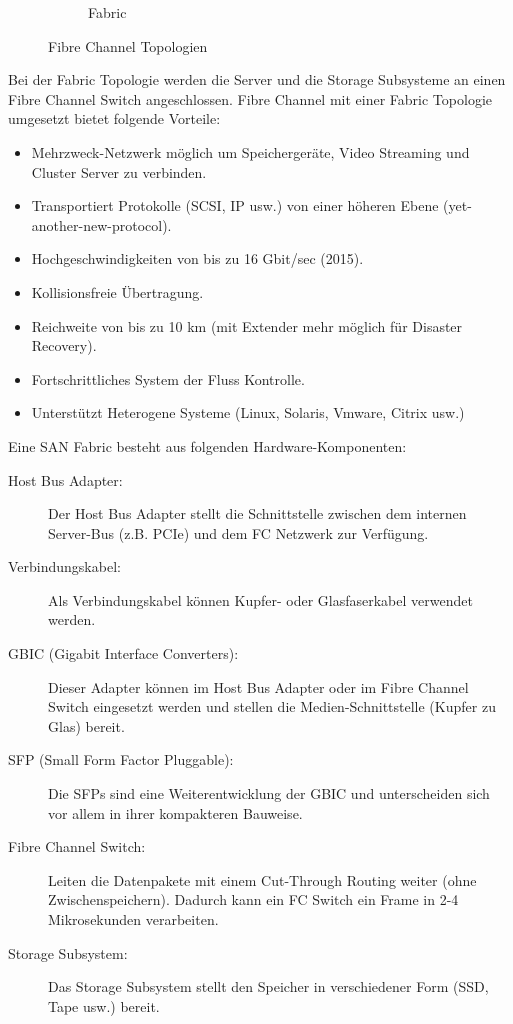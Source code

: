 \begin{figure}[h!]
\begin{subfigure}[b]{0.3\textwidth}
		\caption{Fabric}
	\end{subfigure}
	\caption{Fibre Channel Topologien}\label{fig:fc-topologien}
\end{figure}

\noindent
Bei der Fabric Topologie werden die Server und die Storage Subsysteme an einen Fibre Channel Switch angeschlossen. Fibre Channel mit einer Fabric Topologie umgesetzt bietet folgende Vorteile:
\begin{itemize}
	\item Mehrzweck-Netzwerk möglich um Speichergeräte, Video Streaming und Cluster Server zu verbinden.
	\item Transportiert Protokolle (SCSI, IP usw.) von einer höheren Ebene (yet-another-new-protocol).
	\item Hochgeschwindigkeiten von bis zu 16 Gbit/sec (2015).
	\item Kollisionsfreie Übertragung.
	\item Reichweite von bis zu 10 km (mit Extender mehr möglich für Disaster Recovery).
	\item Fortschrittliches System der Fluss Kontrolle.
	\item Unterstützt Heterogene Systeme (Linux, Solaris, Vmware, Citrix usw.)
\end{itemize}
Eine SAN Fabric besteht aus folgenden Hardware-Komponenten:
\begin{description}
	\item[Host Bus Adapter:] Der Host Bus Adapter stellt die Schnittstelle zwischen dem internen Server-Bus (z.B. PCIe) und dem FC Netzwerk zur Verfügung.
	\item[Verbindungskabel:] Als Verbindungskabel können Kupfer- oder Glasfaserkabel verwendet werden.
	\item[GBIC (Gigabit Interface Converters):] Dieser Adapter können im Host Bus Adapter oder im Fibre Channel Switch eingesetzt werden und stellen die Medien-Schnittstelle (Kupfer zu Glas) bereit.
	\item[SFP (Small Form Factor Pluggable):] Die SFPs sind eine Weiterentwicklung der GBIC und unterscheiden sich vor allem in ihrer kompakteren Bauweise.
	\item[Fibre Channel Switch:] Leiten die Datenpakete mit einem Cut-Through Routing weiter (ohne Zwischenspeichern). Dadurch kann ein FC Switch ein Frame in 2-4 Mikrosekunden verarbeiten.
	\item[Storage Subsystem:] Das Storage Subsystem stellt den Speicher in verschiedener Form (SSD, Tape usw.) bereit.
\end{description}

